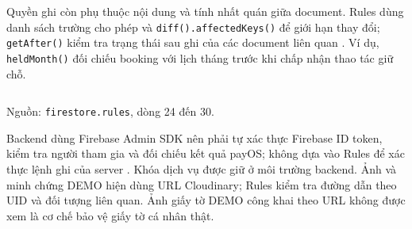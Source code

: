 Quyền ghi còn phụ thuộc nội dung và tính nhất quán giữa document. Rules dùng danh sách trường cho phép và \texttt{diff().\allowbreak{}affected\allowbreak{}Keys()} để giới hạn thay đổi; \texttt{get\allowbreak{}After()} kiểm tra trạng thái sau ghi của các document liên quan \parencite{firebase_rules_fields,firebase_rules_conditions}. Ví dụ, \texttt{held\allowbreak{}Month()} đối chiếu booking với lịch tháng trước khi chấp nhận thao tác giữ chỗ.

\par\medskip\noindent\begin{minipage}{\linewidth}
\inputminted[firstnumber=1]{text}{Resources/chapter4/code/rules-held-month.txt}
{\footnotesize\noindent Nguồn: \texttt{firestore.\allowbreak{}rules}, dòng 24 đến 30.\par}
\end{minipage}\par\medskip

Backend dùng Firebase Admin SDK nên phải tự xác thực Firebase ID token, kiểm tra người tham gia và đối chiếu kết quả payOS; không dựa vào Rules để xác thực lệnh ghi của server \parencite{firebase_rules_conditions}. Khóa dịch vụ được giữ ở môi trường backend. Ảnh và minh chứng DEMO hiện dùng URL Cloudinary; Rules kiểm tra đường dẫn theo UID và đối tượng liên quan. Ảnh giấy tờ DEMO công khai theo URL không được xem là cơ chế bảo vệ giấy tờ cá nhân thật.

\endgroup
